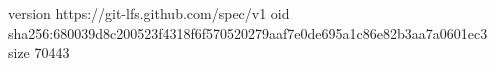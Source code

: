 version https://git-lfs.github.com/spec/v1
oid sha256:680039d8c200523f4318f6f570520279aaf7e0de695a1c86e82b3aa7a0601ec3
size 70443

